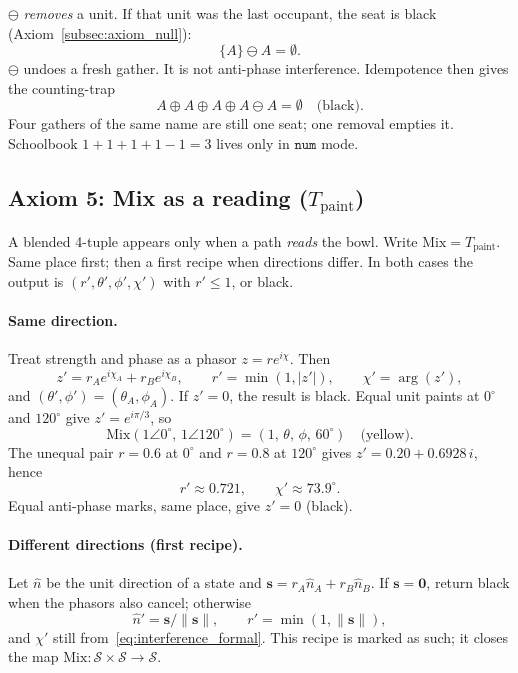 \documentclass[12pt, a4paper]{article}
\begin{document}
$\ominus$ \emph{removes} a unit. If that unit was the last occupant,
the seat is black (Axiom~\ref{subsec:axiom_null}):
\begin{equation}
    \{A\}\ominus A = \emptyset.
    \label{eq:ominus_empty}
\end{equation}
$\ominus$ undoes a fresh gather. It is not anti-phase interference.
Idempotence then gives the counting-trap
\begin{equation}
    A \oplus A \oplus A \oplus A \ominus A = \emptyset
    \quad\text{(black)}.
    \label{eq:four_a_ominus}
\end{equation}
Four gathers of the same name are still one seat; one removal empties
it. Schoolbook $1+1+1+1-1=3$ lives only in $\mathtt{num}$ mode.

\subsection{Axiom 5: Mix as a reading ($T_{\mathrm{paint}}$)}
\label{subsec:axiom_interference}
A blended 4-tuple appears only when a path \emph{reads} the bowl.
Write $\mathrm{Mix}=T_{\mathrm{paint}}$. Same place first; then a
first recipe when directions differ. In both cases the output is
$(r',\theta',\phi',\chi')$ with $r'\le 1$, or black.

\paragraph{Same direction.}
Treat strength and phase as a phasor $z=r e^{i\chi}$. Then
\begin{equation}
    z' = r_A e^{i\chi_A} + r_B e^{i\chi_B},
    \qquad
    r' = \min(1,|z'|),
    \qquad
    \chi' = \arg(z'),
    \label{eq:interference_formal}
\end{equation}
and $(\theta',\phi')=(\theta_A,\phi_A)$. If $z'=0$, the result is
black. Equal unit paints at $0^\circ$ and $120^\circ$ give
$z'=e^{i\pi/3}$, so
\[
\mathrm{Mix}(1\angle 0^\circ,\,1\angle 120^\circ)
=(1,\,\theta,\,\phi,\,60^\circ)
\quad\text{(yellow)}.
\]
The unequal pair $r=0.6$ at $0^\circ$ and $r=0.8$ at $120^\circ$
gives $z'=0.20+0.6928\,i$, hence
\[
r'\approx 0.721,\qquad \chi'\approx 73.9^\circ.
\]
Equal anti-phase marks, same place, give $z'=0$ (black).

\paragraph{Different directions (first recipe).}
Let $\hat n$ be the unit direction of a state and
$\mathbf{s}=r_A\hat n_A+r_B\hat n_B$. If $\mathbf{s}=\mathbf{0}$,
return black when the phasors also cancel; otherwise
\[
\hat n'=\mathbf{s}/\|\mathbf{s}\|,\qquad
r'=\min(1,\|\mathbf{s}\|),
\]
and $\chi'$ still from~\eqref{eq:interference_formal}.
This recipe is marked as such; it closes the map
$\mathrm{Mix}:\mathcal{S}\times\mathcal{S}\to\mathcal{S}$.
\end{document}
